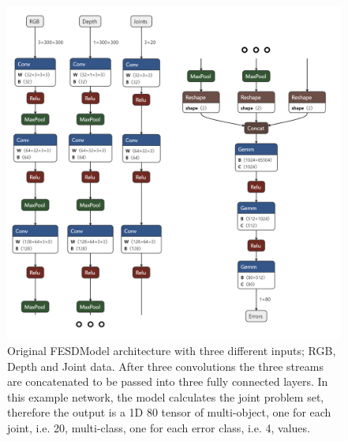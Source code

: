 \begin{figure}[h]
  \centering
  \includegraphics[width=\linewidth]{figures/Model/FESD.png}
  \caption[FESDModel architecture version 1]{Original FESDModel architecture with three different inputs; RGB, Depth and Joint data. After three convolutions the three streams are concatenated to be passed into three fully connected layers. In this example network, the model calculates the joint problem set, therefore the output is a 1D 80 tensor of multi-object, one for each joint, i.e. 20, multi-class, one for each error class, i.e. 4, values.}
  \label{fig:model_architecture_v1}
\end{figure}


